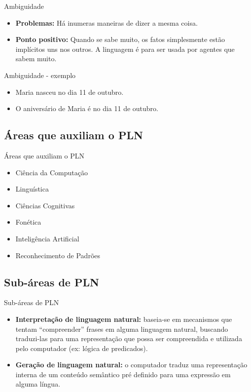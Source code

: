 \begin{frame}{Ambiguidade}
\begin{itemize}
\item \textbf{Problemas:} Há inumeras maneiras de dizer a mesma coisa.
\item \textbf{Ponto positivo:} Quando se sabe muito, os fatos simplesmente estão implícitos uns nos outros. A linguagem é para ser usada por agentes que sabem muito.
\end{itemize}
\end{frame}

\begin{frame}{Ambiguidade - exemplo}
\begin{block}{}
\begin{itemize}
\item Maria nasceu no dia 11 de outubro.
\item O aniversário de Maria é no dia 11 de outubro.
\end{itemize}
\end{block}
\end{frame}

\renewcommand{\titulo}{Áreas que auxiliam o PLN}
\subsection{\titulo}
\begin{frame}{\titulo}
\begin{itemize}
\item Ciência da Computação
\item Linguística
\item Ciências Cognitivas
\item Fonética
\item Inteligência Artificial
\item Reconhecimento de Padrões
\end{itemize}
\end{frame}

\renewcommand{\titulo}{Sub-áreas de PLN}
\subsection{\titulo}
\begin{frame}{\titulo}
\begin{itemize}
\item \textbf{Interpretação de linguagem natural:} baseia-se em mecanismos que tentam ``compreender'' frases em alguma linguagem natural, buscando traduzi-las para uma representação que possa ser compreendida e utilizada pelo computador (ex: lógica de predicados).
\item \textbf{Geração de linguagem natural:} o computador traduz uma representação interna de um conteúdo semântico pré definido para uma expressão em alguma língua.
\end{itemize}
\end{frame}


